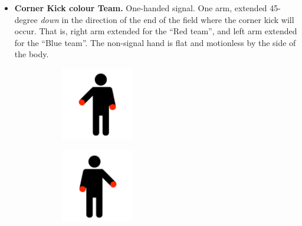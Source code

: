 \begin{itemize}
            \item \textbf{Corner Kick \textlangle{}colour\textrangle{} Team.}
            One-handed signal. One arm, extended 45-degree \emph{down} in the direction of the end of the field where the corner kick will occur. That is, right arm extended for the ``Red team'', and left arm extended for the ``Blue team''. The non-signal hand is flat and motionless by the side of the body.
            \begin{figure}[ht!]
                \centering
                \begin{subfigure}{.33\textwidth}
                  \includegraphics[height=120px]{figs/referee-signals/corner-kick.png}
                \end{subfigure}
                \begin{subfigure}{.33\textwidth}
                  \includegraphics[height=120px]{figs/referee-signals/corner-kick-flipped.png}
                \end{subfigure}
            \end{figure}
            


\end{itemize}
